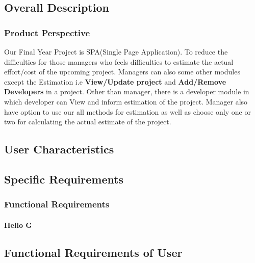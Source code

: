 \subsection{Overall Description}
\subsubsection{Product Perspective}
Our Final Year Project is SPA(Single Page Application). To reduce the difficulties for those managers who feels 
difficulties to estimate the actual effort/cost of the upcoming project. Managers can also some other modules except
the Estimation i.e {\bfseries View/Update project} and {\bfseries Add/Remove Developers} in a project. Other than manager, there is a developer module in which developer 
can View and inform estimation of the project. Manager also have option to use our all methods for estimation as well as choose only one or two for calculating the actual estimate of the project.

    
\subsection{User Characteristics}
\blindtext[2]

\subsection{Specific Requirements}
\blindtext[2]

\subsubsection{Functional Requirements}
\paragraph{Hello G}

\subsection{Functional Requirements of User}


\newpage

